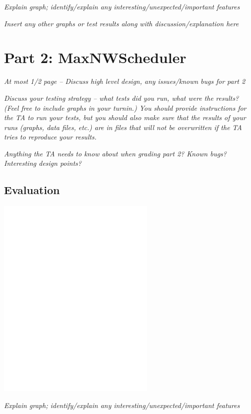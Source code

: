 \documentclass[11pt, letterpaper]{article}
\begin{document}
{\em Explain graph; identify/explain any
  interesting/unexpected/important features}

{\em Insert any other graphs or test results along with
  discussion/explanation here}



\section{Part 2: MaxNWScheduler}

{\em At most 1/2 page -- Discuss high level design, any issues/known
  bugs for part 2}

{\em Discuss your testing strategy -- what tests did you run, what were the
results?  (Feel free to include graphs in your turnin.) You should
provide instructions for the TA to run your tests, but you should also
make sure that the results of your runs (graphs, data files, etc.) are
in files that will not be overwritten if the TA tries to reproduce
your results.}

{\em Anything the TA needs to know about when grading part 2? Known bugs?
Interesting design points?}


\subsection{Evaluation}

\centerline{\includegraphics[width=3in]{plot2}}

{\em Explain graph; identify/explain any
  interesting/unexpected/important features}
\end{document}
